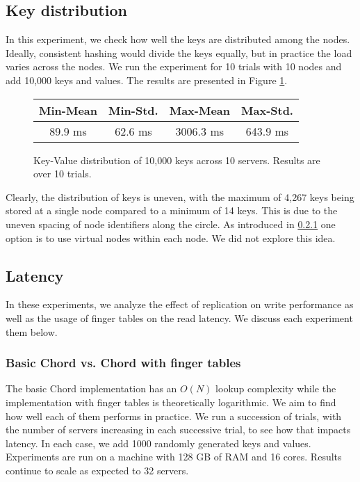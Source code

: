 \documentclass{sig-alternate-10pt}
\begin{document}
\subsection{Key distribution}
In this experiment, we check how well the keys are distributed among the nodes. Ideally, consistent hashing would divide the keys equally, but in practice the load varies across the nodes. We run the experiment for 10 trials with 10 nodes and add 10,000 keys and values. The results are presented in Figure \ref{fig:keydist}.

\begin{figure}[hb]
  \centering
\begin{tabular}{ c | c | c | c }
  Min-Mean & Min-Std. & Max-Mean & Max-Std. \\
  \hline
  89.9 ms & 62.6 ms & 3006.3 ms & 643.9 ms \\
\end{tabular}
  \caption{Key-Value distribution of 10,000 keys across 10 servers.  Results are over 10 trials.}
  \label{fig:keydist}
\end{figure}

Clearly, the distribution of keys is uneven, with the maximum of 4,267 keys being stored at a single node compared to a minimum of 14 keys. This is due to the uneven spacing of node identifiers along the circle.  As introduced in \ref{} one option is to use virtual nodes within each node.  We did not explore this idea.

\subsection{Latency}
In these experiments, we analyze the effect of replication on write performance as well as the usage of finger tables on the read latency. We discuss each experiment them below.

\subsubsection{Basic Chord vs. Chord with finger tables}
The basic Chord implementation has an $O(N)$ lookup complexity while the implementation with finger tables is theoretically logarithmic. We aim to find how well each of them performs in practice. We run a succession of trials, with the number of servers increasing in each successive trial, to see how that impacts latency. In each case, we add 1000 randomly generated keys and values. Experiments are run on a machine with 128 GB of RAM and 16 cores. Results continue to scale as expected to 32 servers.  
\end{document}
